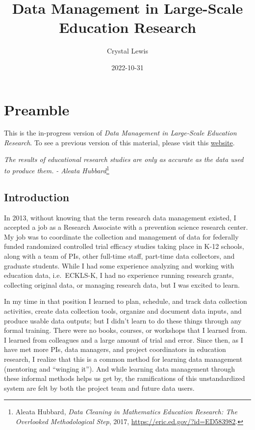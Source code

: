 \documentclass[
]{book}
\title{Data Management in Large-Scale Education Research}
\author{Crystal Lewis}
\date{2022-10-31}
\begin{document}
\maketitle

{
\setcounter{tocdepth}{1}
\tableofcontents
}
\hypertarget{preamble}{%
\chapter{Preamble}\label{preamble}}

This is the in-progress version of \emph{Data Management in Large-Scale Education Research}. To see a previous version of this material, please visit this \href{https://cghlewis.github.io/mpsi-data-training/}{website}.

\emph{The results of educational research studies are only as accurate as the data used to produce them.}
\emph{- Aleata Hubbard}\footnote{Aleata Hubbard, \emph{Data Cleaning in Mathematics Education Research: The Overlooked Methodological Step}, 2017, \url{https://eric.ed.gov/?id=ED583982}.}

\hypertarget{introduction}{%
\section{Introduction}\label{introduction}}

In 2013, without knowing that the term research data management existed, I accepted a job as a Research Associate with a prevention science research center. My job was to coordinate the collection and management of data for federally funded randomized controlled trial efficacy studies taking place in K-12 schools, along with a team of PIs, other full-time staff, part-time data collectors, and graduate students. While I had some experience analyzing and working with education data, i.e.~ECKLS-K, I had no experience running research grants, collecting original data, or managing research data, but I was excited to learn.

In my time in that position I learned to plan, schedule, and track data collection activities, create data collection tools, organize and document data inputs, and produce usable data outputs; but I didn't learn to do these things through any formal training. There were no books, courses, or workshops that I learned from. I learned from colleagues and a large amount of trial and error. Since then, as I have met more PIs, data managers, and project coordinators in education research, I realize that this is a common method for learning data management (mentoring and ``winging it''). And while learning data management through these informal methods helps us get by, the ramifications of this unstandardized system are felt by both the project team and future data users.
\end{document}
